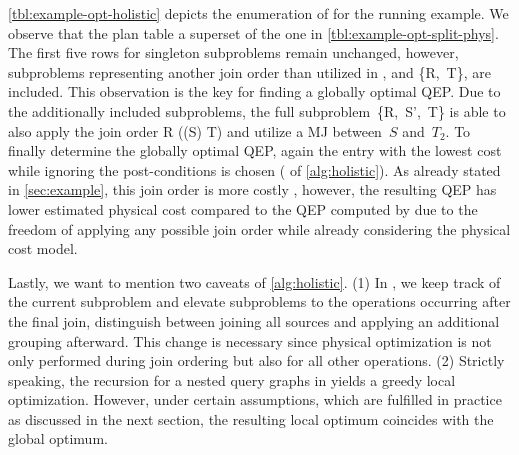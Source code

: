 \autoref{tbl:example-opt-holistic} depicts the enumeration of \holistic for the running example.  We observe that the plan table  a superset of the one in \autoref{tbl:example-opt-split-phys}.  The first five rows for singleton subproblems remain unchanged, however, subproblems representing another join order than utilized in \split, \eg {} and \{R,~T\}, are included.  This observation is the key for finding a globally optimal QEP.    Due to the additionally included subproblems, the full subproblem~\{R,~S',~T\} is able to also apply the join order R \join (\filter(S) \join T) and utilize a MJ between~$S$ and~$T_2$.  To finally determine the globally optimal QEP, again the entry with the lowest cost while ignoring the post-conditions is chosen ( of \autoref{alg:holistic}).  As already stated in \autoref{sec:example}, this join order is more costly \wrt \Cout, however, the resulting QEP has lower estimated physical cost compared to the QEP computed by \split due to the freedom of applying any possible join order while already considering the physical cost model.

Lastly, we want to mention two caveats of \autoref{alg:holistic}.  (1) In , we keep track of the current subproblem and elevate subproblems to the operations occurring after the final join, \eg distinguish between joining all sources and applying an additional grouping afterward.  This change is necessary since physical optimization is not only performed during join ordering but also for all other operations.  (2) Strictly speaking, the recursion for a nested query graphs in  yields a greedy local optimization.  However, under certain assumptions, which are fulfilled in practice as discussed in the next section, the resulting local optimum coincides with the global optimum.

